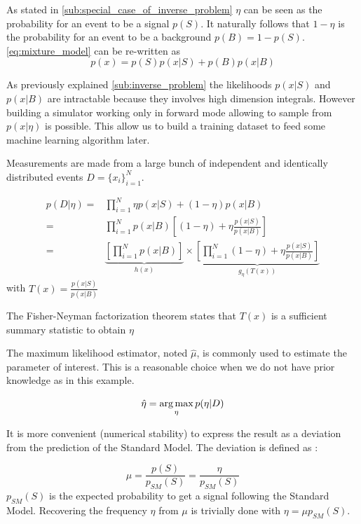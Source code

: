 As stated in \autoref{sub:special_case_of_inverse_problem} $\eta$ can be seen as the probability for an event to be a signal $p(S)$. 
It naturally follows that $1-\eta$ is the probability for an event to be a background $p(B)=1-p(S)$.
\autoref{eq:mixture_model} can be re-written as
\begin{equation}
	p(x) = p(S)p(x|S) + p(B)p(x|B)
\end{equation}

As previously explained \autoref{sub:inverse_problem} the likelihoods $p(x|S)$ and $p(x|B)$ are intractable because they involves high dimension integrals.
However building a simulator working only in forward mode allowing to sample from $p(x|\eta)$ is possible.
This allow us to build a training dataset to feed some machine learning algorithm later.

Measurements are made from a large bunch of independent and identically distributed events $D=\{x_i\}_{i=1}^N$.

\begin{align}
	p(D|\eta) =& \prod_{i=1}^N \eta p(x|S) + (1-\eta) p(x|B) \\
	       =& \prod_{i=1}^N p(x|B) \left [(1-\eta) + \eta \frac{p(x|S)}{p(x|B)} \right ]\\
	       =& \underbrace{\left[ \prod_{i=1}^N p(x|B) \right ]}_{h(x)} \times 
	       \underbrace{\left [\prod_{i=1}^N (1-\eta) + \eta \frac{p(x|S)}{p(x|B)} \right ]}_{g_\eta(T(x))}
\label{eq:Fisher-Neyman}
\end{align}
with $T(x) = \frac{p(x|S)}{p(x|B)} $

The Fisher-Neyman factorization theorem \needcite states that $T(x)$ is a sufficient summary statistic to obtain $\eta$

The maximum likelihood estimator, noted $\hat \mu$, is commonly used to estimate the parameter of interest.
This is a reasonable choice when we do not have prior knowledge as in this example.

\begin{equation}
	\hat \eta = \operatorname*{arg\,max}_\eta p(\eta | D)
\end{equation}

It is more convenient (numerical stability) to express the result as a deviation from the prediction of the Standard Model.
The deviation is defined as :

\begin{equation}
	\mu = \frac{p(S)}{p_{SM}(S)} = \frac{\eta}{p_{SM}(S)}
\end{equation}
$p_{SM}(S)$ is the expected probability to get a signal following the Standard Model.
Recovering the frequency $\eta$ from $\mu$ is trivially done with $\eta = \mu p_{SM}(S)$.

